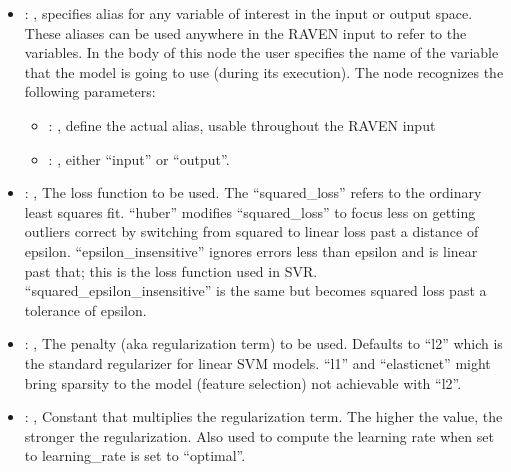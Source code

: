 \begin{itemize}
    \item {}: , 
      specifies alias for         any variable of interest in the input or output space. These
      aliases can be used anywhere in the RAVEN input to         refer to the variables. In the body
      of this node the user specifies the name of the variable that the model is going to use
      (during its execution).
      The  node recognizes the following parameters:
        \begin{itemize}
          \item {}: , 
            define the actual alias, usable throughout the RAVEN input
          \item {}: , 
            either ``input'' or ``output''.
      \end{itemize}

    \item {}: , 
      The loss function to be used.                                                  The
      ``squared\_loss'' refers to the ordinary least squares fit. ``huber'' modifies
      ``squared\_loss'' to focus less on getting outliers correct by
      switching from squared to linear loss past a distance of epsilon. ``epsilon\_insensitive''
      ignores errors less than epsilon and is linear past
      that; this is the loss function used in SVR. ``squared\_epsilon\_insensitive'' is the same but
      becomes squared loss past a tolerance of epsilon.

    \item {}: \xmlDesc{[l2, l1, elasticnet]}, 
      The penalty (aka regularization term) to be used. Defaults to ``l2'' which is the standard
      regularizer for linear SVM models.                                                  ``l1'' and
      ``elasticnet'' might bring sparsity to the model (feature selection) not achievable with
      ``l2''.

    \item {}: , 
      Constant that multiplies the regularization term. The higher the value, the stronger the
      regularization. Also used to compute                                                  the
      learning rate when set to learning\_rate is set to ``optimal''.


\end{itemize}
